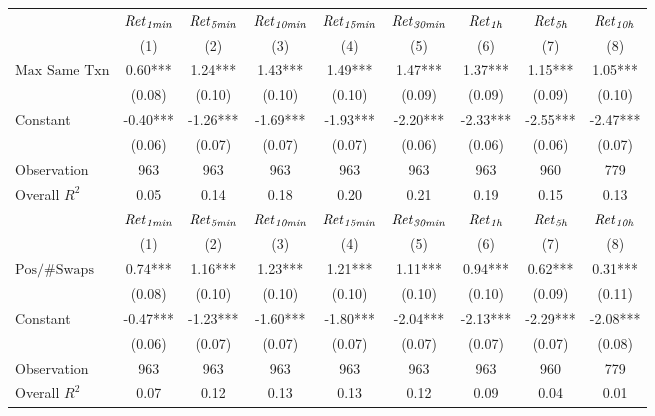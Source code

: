 \begin{tabular}{lcccccccc}
\hline
 & ${\it Ret}_{\it 1min}$ & ${\it Ret}_{\it 5min}$ & ${\it Ret}_{\it 10min}$ & ${\it Ret}_{\it 15min}$ & ${\it Ret}_{\it 30min}$ & ${\it Ret}_{\it 1h}$ & ${\it Ret}_{\it 5h}$ & ${\it Ret}_{\it 10h}$ \\
 & (1) & (2) & (3) & (4) & (5) & (6) & (7) & (8) \\
\hline
$\text{Max Same Txn}$ & 0.60*** & 1.24*** & 1.43*** & 1.49*** & 1.47*** & 1.37*** & 1.15*** & 1.05*** \\
 & (0.08) & (0.10) & (0.10) & (0.10) & (0.09) & (0.09) & (0.09) & (0.10) \\
Constant & -0.40*** & -1.26*** & -1.69*** & -1.93*** & -2.20*** & -2.33*** & -2.55*** & -2.47*** \\
 & (0.06) & (0.07) & (0.07) & (0.07) & (0.06) & (0.06) & (0.06) & (0.07) \\
Observation & 963 & 963 & 963 & 963 & 963 & 963 & 960 & 779 \\
Overall $R^2$ & 0.05 & 0.14 & 0.18 & 0.20 & 0.21 & 0.19 & 0.15 & 0.13 \\
\hline
 & ${\it Ret}_{\it 1min}$ & ${\it Ret}_{\it 5min}$ & ${\it Ret}_{\it 10min}$ & ${\it Ret}_{\it 15min}$ & ${\it Ret}_{\it 30min}$ & ${\it Ret}_{\it 1h}$ & ${\it Ret}_{\it 5h}$ & ${\it Ret}_{\it 10h}$ \\
 & (1) & (2) & (3) & (4) & (5) & (6) & (7) & (8) \\
\hline
$\text{Pos/\#Swaps}$ & 0.74*** & 1.16*** & 1.23*** & 1.21*** & 1.11*** & 0.94*** & 0.62*** & 0.31*** \\
 & (0.08) & (0.10) & (0.10) & (0.10) & (0.10) & (0.10) & (0.09) & (0.11) \\
Constant & -0.47*** & -1.23*** & -1.60*** & -1.80*** & -2.04*** & -2.13*** & -2.29*** & -2.08*** \\
 & (0.06) & (0.07) & (0.07) & (0.07) & (0.07) & (0.07) & (0.07) & (0.08) \\
Observation & 963 & 963 & 963 & 963 & 963 & 963 & 960 & 779 \\
Overall $R^2$ & 0.07 & 0.12 & 0.13 & 0.13 & 0.12 & 0.09 & 0.04 & 0.01 \\
\hline
\end{tabular}
